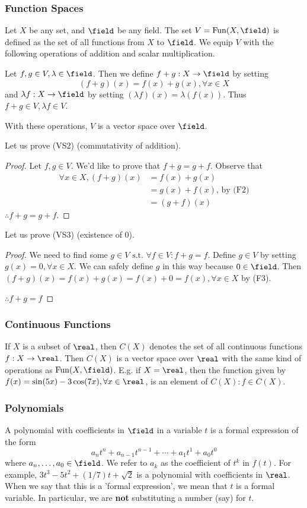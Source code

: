 \subsubsection{Function Spaces}
Let \(X\) be any set, and \(\field\) be any field. The set \(V = \operatorname{Fun}(X, \field)\) is defined as the set of all functions from \(X\) to \(\field\). We equip \(V\) with the following operations of addition and scalar multiplication.

Let \(f,g\in V, \lambda \in \field\). 
Then we define \(f + g : X \to \field\) by setting
\[(f+g)(x)=f(x) + g(x), \forall x\in X\] 
and \(\lambda f : X \to \field\) by setting
\((\lambda f)(x) = \lambda(f(x))\). Thus \(f+g \in V, \lambda f \in V\).

With these operations, \(V\) is a vector space over \(\field\).

Let us prove (VS2) (commutativity of addition).
\begin{proof}
Let \(f,g\in V\). We'd like to prove that \(f+g=g+f\). Observe that 
\begin{align*}
	\forall x\in X, (f+g)(x) 	&= f(x)+g(x) \\
					&= g(x)+f(x)\text{, by (F2)} \\
					&= (g+f)(x)
\end{align*}
\(\therefore f+g=g+f\).
\end{proof}

Let us prove (VS3) (existence of 0).
\begin{proof}
We need to find some \(g\in V \text{ s.t. } \forall f\in V : f + g = f\).
Define \(g\in V\) by setting \(g(x)=0, \forall x \in X\). We can safely define \(g\) in this way because \(0\in\field\). Then \((f+g)(x)=f(x)+g(x)=f(x)+0=f(x), \forall x\in X\) by (F3).

\(\therefore f + g = f\)
\end{proof}

\subsubsection{Continuous Functions}
If \(X\) is a subset of \(\real\), then \(C(X)\) denotes the set of all continuous functions \(f:X\to\real\). Then \(C(X)\) is a vector space over \(\real\) with the same kind of operations as \(\operatorname{Fun}(X, \field)\). E.g. if \(X=\real\), then the function given by \(f(x)=\sin(5x)-3\cos(7x), \forall x \in \real\), is an element of \(C(X) : f\in C(X)\).

\subsubsection{Polynomials}
A polynomial with coefficients in \(\field\) in a variable \(t\) is a formal expression of the form
\[a_n t^n + a_{n-1}t^{n-1} + \dotsb + a_1 t^1 + a_0 t^0\]
where \(a_n, \dotsc, a_0 \in \field\). We refer to \(a_k\) as the coefficient of \(t^k\) in \(f(t)\). For example, \(3t^3 - 5t^2 + (1/7)t + \sqrt{2}\) is a polynomial with coefficients in \(\real\). When we say that this is a 'formal expression', we mean that \(t\) is a formal variable. In particular, we are \textbf{not} substituting a number (say) for \(t\). 

